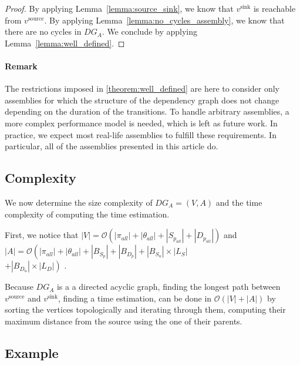\begin{proof}
 By applying Lemma~\ref{lemma:source_sink}, we know that $v^\text{sink}$ is reachable
 from $v^\text{source}$. By applying Lemma~\ref{lemma:no_cycles_assembly}, we know
 that there are no cycles in $DG_A$. We conclude by applying
 Lemma~\ref{lemma:well_defined}.
\end{proof}

\paragraph{Remark}

The restrictions imposed in \ref{theorem:well_defined} are here to consider only
assemblies for which the structure of the dependency graph does not change
depending on the duration of the transitions. To handle arbitrary assemblies,
a more complex performance model is needed, which is left as future work. In
practice, we expect most real-life assemblies to fulfill these requirements.
In particular, all of the assemblies presented in this article do.


\subsection{Complexity}

We now determine the size complexity of $DG_A=(V,A)$ and the time
complexity of computing the time estimation.

First, we notice that
$|V| = \mathcal{O}\left(\left|\pi_{all}\right|+\left|\theta_{all}\right|+\left|S_{p_{all}}\right|+\left|D_{p_{all}}\right|\right)$
and
$|A| = \mathcal{O}\left(\left|\pi_{all}\right|+\left|\theta_{all}\right|+\left|B_{S_p}\right|+\left|B_{D_p}\right|+\left|B_{S_u}\right|\times\left|L_S\right|\right.$ \\
$\left.+\left|B_{D_u}\right|\times\left|L_D\right|\right)$
.

Because $DG_A$ is a a directed acyclic graph, finding the longest path
between $v^\text{source}$ and $v^\text{sink}$, \ie finding a time estimation,
can be done in $\mathcal{O}(|V|+|A|)$ by sorting the
vertices topologically and iterating through them, computing their maximum
distance from the source using the one of their parents.
\subsection{Example}

